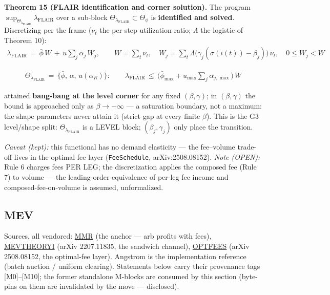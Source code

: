 \documentclass[11pt]{article}
\renewcommand{\_}{\textunderscore\allowbreak}
\begin{document}
\textbf{Theorem 15 (FLAIR identification and corner solution).} The program \(\sup_{\Theta_{\lambda_{\text{FLAIR}}}} \lambda_{\text{FLAIR}}\) over a sub-block \(\Theta_{\lambda_{\text{FLAIR}}} \subset \Theta_{\phi}\) is \textbf{identified and solved}. Discretizing per the frame (\(\nu_t\) the per-step utilization ratio; \(\Lambda\) the logistic of Theorem 10): \[
    \begin{aligned}
        \lambda_{\text{FLAIR}} \, = \, \bar\phi\, W \, + \, u \sum_j \alpha_j\, W_j, \qquad
        W = \sum_t \nu_t, \quad
        W_j = \sum_t \Lambda\big(\gamma_j(\sigma(i(t))-\beta_j)\big)\, \nu_t, \quad 0 \leq W_j < W
    \end{aligned}
\]

\[
    \begin{aligned}
        \Theta_{\lambda_{\text{FLAIR}}} \, = \, \{\bar\phi,\, \alpha,\, u(\alpha_R)\}: \qquad
        \lambda_{\text{FLAIR}} \, \leq \, \Big(\bar\phi_{\max} + u_{\max}\sum_j \alpha_{j,\max}\Big)\, W
    \end{aligned}
\]

attained \textbf{bang-bang at the level corner} for any fixed \((\beta,\gamma)\); in \((\beta,\gamma)\) the bound is approached only as \(\beta \to -\infty\) --- a saturation boundary, not a maximum: the shape parameters never attain it (strict gap at every finite \(\beta\)). This is the G3 level/shape split: \(\Theta_{\lambda_{\text{FLAIR}}}\) is a LEVEL block; \((\beta_j, \gamma_j)\) only place the transition.

\emph{Caveat (kept):} this functional has no demand elasticity --- the fee--volume trade-off lives in the optimal-fee layer (\texttt{FeeSchedule}, arXiv:2508.08152). \emph{Note (OPEN):} Rule 6 charges fees PER LEG; the discretization applies the composed fee (Rule 7) to volume --- the leading-order equivalence of per-leg fee income and composed-fee-on-volume is assumed, unformalized.

\subsection*{MEV}\label{mev}

Sources, all vendored: \href{../refs/mev/MilionisMoallemiRoughgardenArbProfitsFees.pdf}{MMR} (the anchor --- arb profits with fees), \href{../refs/mev/KulkarniDiamandisChitraTheoryMEV1.pdf}{MEV\_THEORY\_I} (arXiv 2207.11835, the sandwich channel), \href{../refs/flair/CampbellBergaultMilionisNutzOptimalFees.pdf}{OPT\_FEES} (arXiv 2508.08152, the optimal-fee layer). Angstrom is the implementation reference (batch auction / uniform clearing). Statements below carry their provenance tags {[}M0{]}--{[}M10{]}; the former standalone M-blocks are consumed by this section (byte-pins on them are invalidated by the move --- disclosed).
\end{document}
